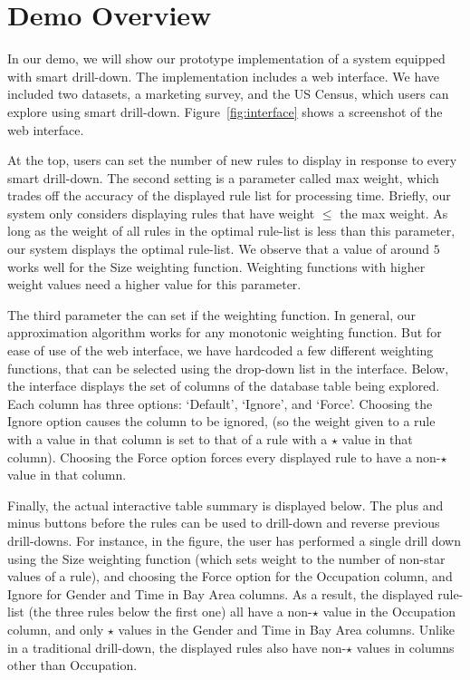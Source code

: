 
\section{Demo Overview} \label{sec:demo} 
In our demo, we will show our prototype implementation of a system equipped with smart drill-down. The implementation includes a web interface. We have included two datasets, a marketing survey, and the US Census, which users can explore using smart drill-down. Figure~\ref{fig:interface} shows a screenshot of the web interface. 

At the top, users can set the number of new rules to display in response to every smart drill-down. The second setting is a parameter called max weight, which trades off the accuracy of the displayed rule list for processing time. Briefly, our system only considers displaying rules that have weight $\leq$ the max weight. As long as the weight of all rules in the optimal rule-list is less than this parameter, our system displays the optimal rule-list. We observe that a value of around $5$ works well for the Size weighting function. Weighting functions with higher weight values need a higher value for this parameter. 

The third parameter the can set if the weighting function. In general, our approximation algorithm works for any monotonic weighting function. But for ease of use of the web interface, we have hardcoded a few different weighting functions, that can be selected using the drop-down list in the interface. Below, the interface displays the set of columns of the database table being explored. Each column has three options: `Default', `Ignore', and `Force'. Choosing the Ignore option causes the column to be ignored, (so the weight given to a rule with a value in that column is set to that of a rule with a $\star$ value in that column). Choosing the Force option forces every displayed rule to have a non-$\star$ value in that column. 

Finally, the actual interactive table summary is displayed below. The plus and minus buttons before the rules can be used to drill-down and reverse previous drill-downs. For instance, in the figure, the user has performed a single drill down using the Size weighting function (which sets weight to the number of non-star values of a rule), and choosing the Force option for the Occupation column, and Ignore for Gender and Time in Bay Area columns. As a result, the displayed rule-list (the three rules below the first one) all have a non-$\star$ value in the Occupation column, and only $\star$ values in the Gender and Time in Bay Area columns. Unlike in a traditional drill-down, the displayed rules also have non-$\star$ values in columns other than Occupation. 

